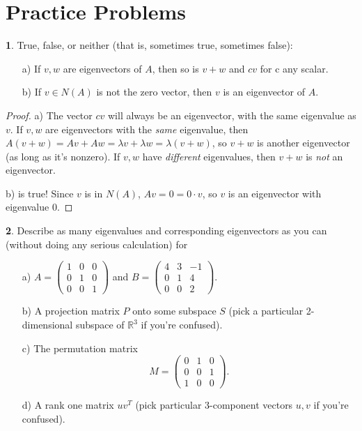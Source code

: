 \documentclass{article}
\theoremstyle{definition}
\newtheorem{prob}{}
\begin{document}
\section*{Practice Problems}
\begin{prob}
True, false, or neither (that is, sometimes true, sometimes false):
\begin{itemize}
	\item[a)] If $v, w$ are eigenvectors of $A$, then so is $v+w$ and $c v$ for c any scalar.
	\item[b)] If $v \in N(A)$ is not the zero vector, then $v$ is an eigenvector of $A$.
\end{itemize}
\end{prob}

\begin{proof}
	a) The vector $c v$ will always be an eigenvector, with the same eigenvalue as $v$. If $v, w$ are eigenvectors with the \emph{same} eigenvalue, then $A(v+w)= Av+ Aw=\lambda v + \lambda w = \lambda(v+w)$, so $v+w$ is another eigenvector (as long as it's nonzero). If $v, w$ have \emph{different} eigenvalues, then $v+w$ is \emph{not} an eigenvector.
	
	b) is true! Since $v$ is in $N(A)$, $Av=0=0 \cdot v$, so $v$ is an eigenvector with eigenvalue 0.
\end{proof}

\begin{prob}
	Describe as many eigenvalues and corresponding eigenvectors as you can (without doing any serious calculation) for
	
	\begin{itemize}
		
		\item[a)] $A = \begin{pmatrix} 1 & 0 & 0 \\ 0 & 1 & 0 \\ 0 & 0 & 1 \end{pmatrix}$ and $B = \begin{pmatrix} 4 & 3 & -1 \\ 0 & 1 & 4 \\ 0 & 0 &2 \end{pmatrix}$.
		
		\item[b)] A projection matrix $P$ onto some subspace $S$ (pick a particular 2-dimensional subspace of $\mathbb{R}^3$ if you're confused).
		
		\item[c)] The permutation matrix
		\[M = \begin{pmatrix} 0 & 1 & 0 \\ 0 & 0 & 1 \\ 1 & 0 & 0 \end{pmatrix}. \]
		
		\item[d)] A rank one matrix $uv^T$ (pick particular 3-component vectors $u, v$ if you're confused).
		
	\end{itemize}
\end{prob}
\end{document}
